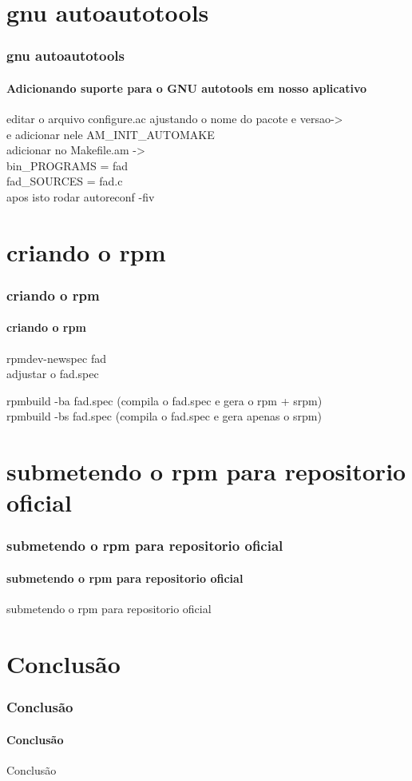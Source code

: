 \documentclass{beamer}
\begin{document}
\section{gnu autoautotools}
\begin{frame}
\frametitle{gnu autoautotools}
\framesubtitle{Adicionando suporte para o GNU autotools em nosso aplicativo}


editar o arquivo configure.ac ajustando o nome do pacote e versao-> \\
e adicionar nele 
AM\_INIT\_AUTOMAKE \\


adicionar no Makefile.am ->  \\

bin\_PROGRAMS =  fad \\
fad\_SOURCES  = fad.c \\

apos isto rodar autoreconf -fiv 


\end{frame}







\section{criando o rpm}
\begin{frame}
\frametitle{criando o rpm}
\framesubtitle{criando o rpm}
rpmdev-newspec fad \\
adjustar o fad.spec 

rpmbuild -ba fad.spec (compila o fad.spec e gera o rpm + srpm) \\ 
rpmbuild -bs fad.spec (compila o fad.spec e gera apenas o srpm) \\ 


\end{frame}


\section{submetendo o rpm para repositorio oficial}
\begin{frame}
\frametitle{submetendo o rpm para repositorio oficial}
\framesubtitle{submetendo o rpm para repositorio oficial}
submetendo o rpm para repositorio oficial
\end{frame}


\section{Conclusão}
\begin{frame}
\frametitle{Conclusão}
\framesubtitle{Conclusão}
Conclusão
\end{frame}
\end{document}
